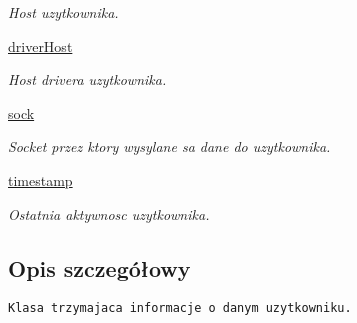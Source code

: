\begin{CompactItemize}
\begin{CompactList}\small\item\em Host uzytkownika. \item\end{CompactList}\item 
\hypertarget{class_serv_1_1_user_1_1_user_7beeb2284a00949cec3e6012ec84b07b}{
\hyperlink{class_serv_1_1_user_1_1_user_7beeb2284a00949cec3e6012ec84b07b}{driverHost}}
\label{class_serv_1_1_user_1_1_user_7beeb2284a00949cec3e6012ec84b07b}

\begin{CompactList}\small\item\em Host drivera uzytkownika. \item\end{CompactList}\item 
\hypertarget{class_serv_1_1_user_1_1_user_1b29d91b1e55fb1089921d3dbceaf5db}{
\hyperlink{class_serv_1_1_user_1_1_user_1b29d91b1e55fb1089921d3dbceaf5db}{sock}}
\label{class_serv_1_1_user_1_1_user_1b29d91b1e55fb1089921d3dbceaf5db}

\begin{CompactList}\small\item\em Socket przez ktory wysylane sa dane do uzytkownika. \item\end{CompactList}\item 
\hypertarget{class_serv_1_1_user_1_1_user_4361ad465bc018dd14f11d50bf0adad5}{
\hyperlink{class_serv_1_1_user_1_1_user_4361ad465bc018dd14f11d50bf0adad5}{timestamp}}
\label{class_serv_1_1_user_1_1_user_4361ad465bc018dd14f11d50bf0adad5}

\begin{CompactList}\small\item\em Ostatnia aktywnosc uzytkownika. \item\end{CompactList}\end{CompactItemize}


\subsection{Opis szczegółowy}


\footnotesize\begin{verbatim}Klasa trzymajaca informacje o danym uzytkowniku.\end{verbatim}
\normalsize
 

